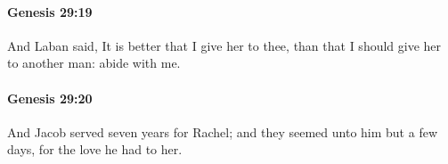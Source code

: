 		\paragraph{Genesis 29:19} %
			\label{GENESIS-29-19}

			And Laban said, It is better that I give her to thee, than that I should give her to another man: abide with me.


		\paragraph{Genesis 29:20} %
			\label{GENESIS-29-20}

			And Jacob served seven years for Rachel; and they seemed unto him but a few days, for the love he had to her.


